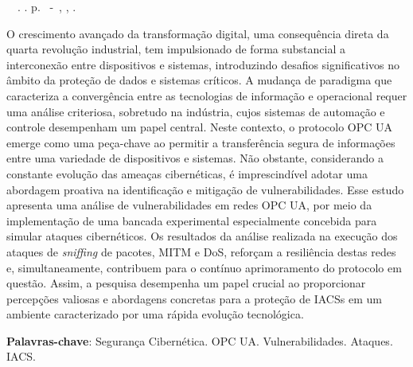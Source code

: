 \setlength{\absparsep}{18pt} %
\begin{resumo}
	\begin{flushleft} 
			\setlength{\absparsep}{0pt} %
			\SingleSpacing 
			\imprimirautorabr~~\textbf{\imprimirtituloresumo}.	\imprimirdata. \pageref{LastPage}p. 
			\imprimirtipotrabalho~-~\imprimirinstituicao, \imprimirlocal, \imprimirdata. 
 	\end{flushleft}
\OnehalfSpacing

O crescimento avançado da transformação digital, uma consequência direta da quarta revolução industrial, tem impulsionado de forma substancial a interconexão entre dispositivos e sistemas, introduzindo desafios significativos no âmbito da proteção de dados e sistemas críticos. A mudança de paradigma que caracteriza a convergência entre as tecnologias de informação e operacional requer uma análise criteriosa, sobretudo na indústria, cujos sistemas de automação e controle desempenham um papel central. Neste contexto, o protocolo OPC UA emerge como uma peça-chave ao permitir a transferência segura de informações entre uma variedade de dispositivos e sistemas. Não obstante, considerando a constante evolução das ameaças cibernéticas, é imprescindível adotar uma abordagem proativa na identificação e mitigação de vulnerabilidades. Esse estudo apresenta uma análise de vulnerabilidades em redes OPC UA, por meio da implementação de uma bancada experimental especialmente concebida para simular ataques cibernéticos. Os resultados da análise realizada na execução dos ataques de \textit{sniffing} de pacotes, MITM e DoS, reforçam a resiliência destas redes e, simultaneamente, contribuem para o contínuo aprimoramento do protocolo em questão. Assim, a pesquisa desempenha um papel crucial ao proporcionar percepções valiosas e abordagens concretas para a proteção de IACSs em um ambiente caracterizado por uma rápida evolução tecnológica.
 
 \textbf{Palavras-chave}: Segurança Cibernética. OPC UA. Vulnerabilidades. Ataques. IACS.
\end{resumo}